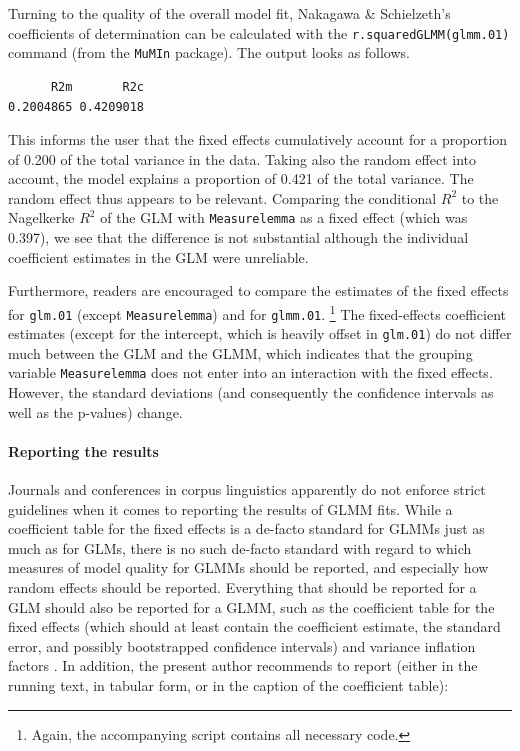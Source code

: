 Turning to the quality of the overall model fit, Nakagawa \& Schielzeth's coefficients of determination can be calculated with the \texttt{r.squaredGLMM(glmm.01)} command (from the \texttt{MuMIn} package).
The output looks as follows.

\vspace{0.5\baselineskip}

\begin{lstlisting}
      R2m       R2c
0.2004865 0.4209018
\end{lstlisting}

This informs the user that the fixed effects cumulatively account for a proportion of 0.200 of the total variance in the data.
Taking also the random effect into account, the model explains a proportion of 0.421 of the total variance.
The random effect thus appears to be relevant.
Comparing the conditional $R^2$ to the Nagelkerke $R^2$ of the GLM with \texttt{Measurelemma} as a fixed effect (which was 0.397), we see that the difference is not substantial although the individual coefficient estimates in the GLM were unreliable.

Furthermore, readers are encouraged to compare the estimates of the fixed effects for \texttt{glm.01} (except \texttt{Measurelemma}) and for \texttt{glmm.01}.%
\footnote{Again, the accompanying script contains all necessary code.}
The fixed-effects coefficient estimates (except for the intercept, which is heavily offset in \texttt{glm.01}) do not differ much between the GLM and the GLMM, which indicates that the grouping variable \texttt{Measurelemma} does not enter into an interaction with the fixed effects.
However, the standard deviations (and consequently the confidence intervals as well as the p-values) change.

\paragraph{Reporting the results}

Journals and conferences in corpus linguistics apparently do not enforce strict guidelines when it comes to reporting the results of GLMM fits.
While a coefficient table for the fixed effects is a de-facto standard for GLMMs just as much as for GLMs, there is no such de-facto standard with regard to which measures of model quality for GLMMs should be reported, and especially how random effects should be reported.
Everything that should be reported for a GLM should also be reported for a GLMM, such as the coefficient table for the fixed effects (which should at least contain the coefficient estimate, the standard error, and possibly bootstrapped confidence intervals) and variance inflation factors \citep{FoxMonette1992,ZuurEa2010}.
In addition, the present author recommends to report (either in the running text, in tabular form, or in the caption of the coefficient table):

